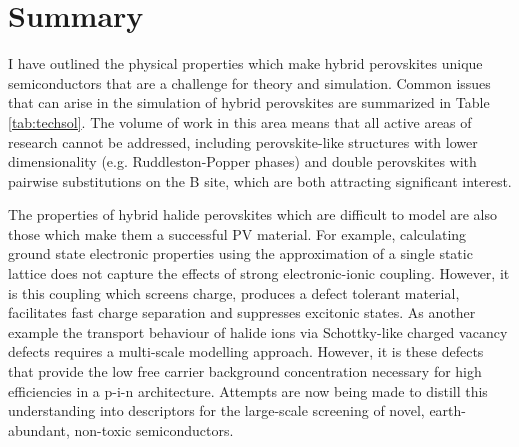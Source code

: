 \section{Summary}

I have outlined the physical properties which make hybrid perovskites unique semiconductors that are a challenge for theory and simulation. 
Common issues that can arise in the simulation of hybrid perovskites are summarized in Table \ref{tab:techsol}.
%
The volume of work in this area means that all active areas of research cannot be addressed, including perovskite-like structures with lower dimensionality (e.g. Ruddleston-Popper phases)\autocite{Tsai2016,Saparov2016b,Ganose2015} and double perovskites with pairwise substitutions on the B site,\autocite{Savory2016,McClure2016a,Wei2016a,Volonakis2016} 
which are both attracting significant interest. 

The properties of hybrid halide perovskites which are difficult to model are also those which make them a successful PV material.
For example, calculating ground state electronic properties using the approximation of a single static lattice does not capture the effects of strong electronic-ionic coupling. However, it is this coupling which screens charge, produces a defect tolerant material, facilitates fast charge separation and suppresses excitonic states.
As another example the transport behaviour of halide ions via Schottky-like charged vacancy defects requires a multi-scale modelling approach.
However, it is these defects that provide the low free carrier background concentration necessary for high efficiencies in a p-i-n architecture.
Attempts are now being made to distill this understanding into descriptors for the large-scale screening of novel, earth-abundant, non-toxic semiconductors.\autocite{Brandt2015a,Ganose2016}


